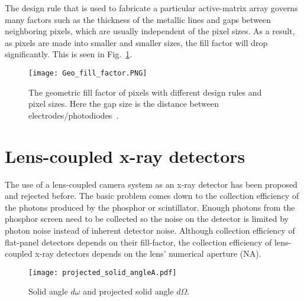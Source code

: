 The design rule that is used to fabricate a particular active-matrix array governs many factors such as the thickness of the metallic lines and gaps between neighboring pixels, which are usually independent of the pixel sizes.  As a result, as pixels are made into smaller and smaller sizes, the fill factor will drop significantly.  This is seen in Fig.~\ref{fig:fill_factor}.

\begin{figure}[ht]
\texttt{[image: Geo\_fill\_factor.PNG]}
\caption[]{The geometric fill factor of pixels with different design rules and pixel sizes.  Here the gap size is the distance between electrodes/photodiodes\footnotemark ~\citep{Rowlands2000}.}
\label{fig:fill_factor}
\end{figure}

\section{Lens-coupled x-ray detectors}
The use of a lens-coupled camera system as an x-ray detector has been proposed and rejected before.  The basic problem comes down to the collection efficiency of the photons produced by the phosphor or scintillator.  Enough photons from the phosphor screen need to be collected so the noise on the detector is limited by photon noise instead of inherent detector noise.  Although collection efficiency of flat-panel detectors depends on their fill-factor, the collection efficiency of lens-coupled x-ray detectors depends on the lens' numerical aperture (NA).

\begin{figure}
	\centering
	\texttt{[image: projected\_solid\_angleA.pdf]}
	\caption{Solid angle $d\omega$ and projected solid angle $d\Omega$.}
	\label{fig:solid_angle}
\end{figure}

